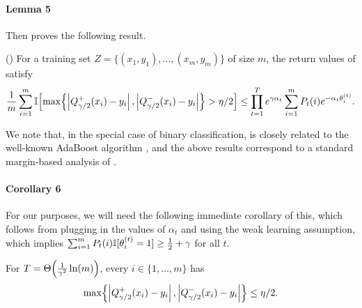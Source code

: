 \paragraph{Lemma 5}


Then \citet{kegl2003robust} proves the following result.

\begin{lemma}
\label{lem:kegl}
(\citet{kegl2003robust}) 
For a training set $Z = \{(x_{1},y_{1}),\ldots,(x_{m},y_{m})\}$ of size $m$, 
the return values of  satisfy 
\begin{equation*}
\frac{1}{m} \sum_{i=1}^{m} \mathbb{I}\!\left[ \max\!\left\{ \left| Q_{\gamma/2}^{+}(x_{i}) - y_{i} \right|, \left| Q_{\gamma/2}^{-}(x_{i}) - y_{i} \right| \right\} > \eta/2 \right] 
\leq \prod_{t=1}^{T} e^{\gamma \alpha_{t}} \sum_{i=1}^{m} P_{t}(i) e^{-\alpha_{t} \theta_{i}^{(t)}}.
\end{equation*}
\end{lemma}

We note that, in the special case of binary classification, 
is closely related to the well-known AdaBoost algorithm
\citep{FreundSchapire97}, 
and the above results correspond to a
standard
margin-based analysis of
\citet{MR1673273}.

    


\paragraph{Corollary 6}

For our purposes, we will need the following immediate corollary of this, 
which follows from plugging in the values of $\alpha_{t}$ and using the weak learning assumption, 
which implies $\sum_{i=1}^{m} P_{t}(i) \mathbb{I}[ \theta_{i}^{(t)} = 1 ] \geq \frac{1}{2} + \gamma$ for all $t$.

\begin{corollary}
\label{cor:kegl-T-size}
For $T = \Theta\!\left(\frac{1}{\gamma^{2}} \ln(m)\right)$, 
every $i \in \{1,\ldots,m\}$ has 
\begin{equation*}
\max\!\left\{ \left| Q_{\gamma/2}^{+}(x_{i}) - y_{i} \right|, \left| Q_{\gamma/2}^{-}(x_{i}) - y_{i} \right| \right\} \leq \eta/2.
\end{equation*}
\end{corollary}


